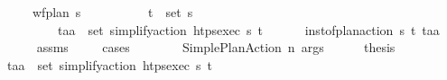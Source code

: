 \begin{isabellebody}
\ \ \ \ \ {\isachardoublequoteopen}wf{\isacharunderscore}{\kern0pt}plan\ {\isasympi}s{\isachardoublequoteclose}\ \isanewline
\ \ \ \ \ \ \ \ \ {\isachardoublequoteopen}{\isacharparenleft}{\kern0pt}t\isactrlsub {\isasympi}{\isacharcomma}{\kern0pt}{\isasympi}{\isacharparenright}{\kern0pt}\ {\isasymin}\ set\ {\isasympi}s{\isachardoublequoteclose}\ \isanewline
\ \ \ \ \ \ \ \ \ {\isachardoublequoteopen}{\isacharparenleft}{\kern0pt}t\isactrlsub a{\isacharcomma}{\kern0pt}a{\isacharparenright}{\kern0pt}\ {\isasymin}\ set\ {\isacharparenleft}{\kern0pt}simplify{\isacharunderscore}{\kern0pt}action\ {\isacharparenleft}{\kern0pt}htps{\isacharunderscore}{\kern0pt}exec\ {\isasympi}s{\isacharparenright}{\kern0pt}\ {\isacharparenleft}{\kern0pt}t\isactrlsub {\isasympi}{\isacharcomma}{\kern0pt}{\isasympi}{\isacharparenright}{\kern0pt}{\isacharparenright}{\kern0pt}{\isachardoublequoteclose}\ \isanewline
\ \ \ \ \ {\isachardoublequoteopen}inst{\isacharunderscore}{\kern0pt}of{\isacharunderscore}{\kern0pt}plan{\isacharunderscore}{\kern0pt}action\ {\isasympi}s\ {\isacharparenleft}{\kern0pt}t\isactrlsub {\isasympi}{\isacharcomma}{\kern0pt}{\isasympi}{\isacharparenright}{\kern0pt}\ {\isacharparenleft}{\kern0pt}t\isactrlsub a{\isacharcomma}{\kern0pt}a{\isacharparenright}{\kern0pt}{\isachardoublequoteclose}\isanewline
%
\isadelimproof
\ \ \ \ %
\endisadelimproof
%
\isatagproof
{}\isamarkupfalse%
\ assms\ \isanewline
\ \ \isamarkupfalse%
\ {\isacharparenleft}{\kern0pt}cases\ {\isasympi}{\isacharparenright}{\kern0pt}\isanewline
\ \ \ \ \isamarkupfalse%
\ {}{\isacharcolon}{\kern0pt}\ {\isacharparenleft}{\kern0pt}Simple{\isacharunderscore}{\kern0pt}Plan{\isacharunderscore}{\kern0pt}Action\ n\ args{\isacharparenright}{\kern0pt}\isanewline
\ \ \ \ \isamarkupfalse%
\ {\isacharquery}{\kern0pt}thesis\ \isanewline
\ \ \ \ \ \ \isamarkupfalse%
\ {\isacartoucheopen}{\isacharparenleft}{\kern0pt}t\isactrlsub a{\isacharcomma}{\kern0pt}a{\isacharparenright}{\kern0pt}\ {\isasymin}\ set\ {\isacharparenleft}{\kern0pt}simplify{\isacharunderscore}{\kern0pt}action\ {\isacharparenleft}{\kern0pt}htps{\isacharunderscore}{\kern0pt}exec\ {\isasympi}s{\isacharparenright}{\kern0pt}\ {\isacharparenleft}{\kern0pt}t\isactrlsub {\isasympi}{\isacharcomma}{\kern0pt}{\isasympi}{\isacharparenright}{\kern0pt}{\isacharparenright}{\kern0pt}{\isacartoucheclose}\ \isanewline
\ \ \ \ \ \ \isamarkupfalse%

\end{isabellebody}
